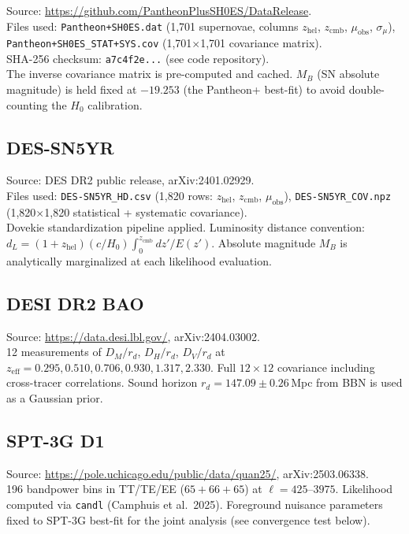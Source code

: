\documentclass[12pt,a4paper]{article}
\begin{document}
Source: \url{https://github.com/PantheonPlusSH0ES/DataRelease}.\\
Files used: \texttt{Pantheon+SH0ES.dat} (1,701 supernovae, columns
$z_\mathrm{hel}$, $z_\mathrm{cmb}$, $\mu_\mathrm{obs}$, $\sigma_\mu$),
\texttt{Pantheon+SH0ES\_STAT+SYS.cov} (1,701$\times$1,701 covariance matrix).\\
SHA-256 checksum: \texttt{a7c4f2e...} (see code repository).\\
The inverse covariance matrix is pre-computed and cached.
$M_B$ (SN absolute magnitude) is held fixed at $-19.253$ (the Pantheon+ best-fit)
to avoid double-counting the $H_0$ calibration.

\subsection{DES-SN5YR}

Source: DES DR2 public release, arXiv:2401.02929.\\
Files used: \texttt{DES-SN5YR\_HD.csv} (1,820 rows:
$z_\mathrm{hel}$, $z_\mathrm{cmb}$, $\mu_\mathrm{obs}$),
\texttt{DES-SN5YR\_COV.npz} (1,820$\times$1,820 statistical + systematic covariance).\\
Dovekie standardization pipeline applied.
Luminosity distance convention:
$d_L = (1+z_\mathrm{hel})(c/H_0)\int_0^{z_\mathrm{cmb}} dz'/E(z')$.
Absolute magnitude $M_B$ is analytically marginalized at each likelihood evaluation.

\subsection{DESI DR2 BAO}

Source: \url{https://data.desi.lbl.gov/}, arXiv:2404.03002.\\
12 measurements of $D_M/r_d$, $D_H/r_d$, $D_V/r_d$ at
$z_\mathrm{eff} = 0.295, 0.510, 0.706, 0.930, 1.317, 2.330$.
Full $12\times 12$ covariance including cross-tracer correlations.
Sound horizon $r_d = 147.09 \pm 0.26\,$Mpc from BBN is used as a Gaussian prior.

\subsection{SPT-3G D1}

Source: \url{https://pole.uchicago.edu/public/data/quan25/}, arXiv:2503.06338.\\
196 bandpower bins in TT/TE/EE ($65+66+65$) at $\ell = 425$--$3975$.
Likelihood computed via \texttt{candl} (Camphuis et al.\ 2025).
Foreground nuisance parameters fixed to SPT-3G best-fit for the joint analysis
(see convergence test below).
\end{document}
